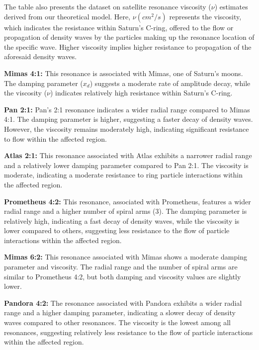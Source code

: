 \documentclass{article}
\begin{document}

The table also presents the dataset on satellite resonance viscosity ($\nu$) estimates derived from our theoretical model. Here, $\nu (cm^{2}/s)$ represents the viscosity, which indicates the resistance within Saturn's C-ring, offered to the flow or propagation of density waves by the particles making up the resonance location of the specific wave. Higher viscosity implies higher resistance to propagation of the aforesaid density waves.

\textbf{Mimas 4:1:}
This resonance is associated with Mimas, one of Saturn's moons. The damping parameter ($x_d$) suggests a moderate rate of amplitude decay, while the viscosity ($\nu$) indicates relatively high resistance within Saturn's C-ring.

\textbf{Pan 2:1:}
Pan's 2:1 resonance indicates a wider radial range compared to Mimas 4:1. The damping parameter is higher, suggesting a faster decay of density waves. However, the viscosity remains moderately high, indicating significant resistance to flow within the affected region.

\textbf{Atlas 2:1:}
This resonance associated with Atlas exhibits a narrower radial range and a relatively lower damping parameter compared to Pan 2:1. The viscosity is moderate, indicating a moderate resistance to ring particle interactions within the affected region.

\textbf{Prometheus 4:2:}
This resonance, associated with Prometheus, features a wider radial range and a higher number of spiral arms (3). The damping parameter is relatively high, indicating a fast decay of density waves, while the viscosity is lower compared to others, suggesting less resistance to the flow of particle interactions within the affected region.

\textbf{Mimas 6:2:}
This resonance associated with Mimas shows a moderate damping parameter and viscosity. The radial range and the number of spiral arms are similar to Prometheus 4:2, but both damping and viscosity values are slightly lower.

\textbf{Pandora 4:2:}
The resonance associated with Pandora exhibits a wider radial range and a higher damping parameter, indicating a slower decay of density waves compared to other resonances. The viscosity is the lowest among all resonances, suggesting relatively less resistance to the flow of particle interactions within the affected region.
\end{document}
